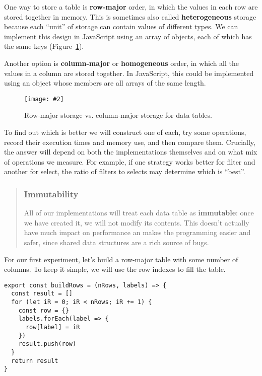 \documentclass[krantzl]{krantz}
\newcommand{\figpdf}[4]{\begin{figure}%
\centering%
\texttt{[image: \#2]}%
\caption{#3}%
\label{#1}%
\end{figure}}
\newcommand{\figref}[1]{Figure~\ref{#1}}
\newcommand{\glossref}[1]{\textbf{#1}}
\newenvironment{callout}{\savenotes\begin{tBox}\begin{quotation}\toggletrue{inbox}\renewcommand{\thempfootnote}{\arabic{footnote}}}{\end{quotation}\vspace{\baselineskip}\end{tBox}\togglefalse{inbox}\spewnotes}
\begin{document}
One way to store a table is \glossref{row-major} order,
in which the values in each row are stored together in memory.
This is sometimes also called \glossref{heterogeneous} storage
because each “unit” of storage can contain values of different types.
We can implement this design in JavaScript using an array of objects,
each of which has the same keys
(\figref{data-table-storage-order}).


Another option is \glossref{column-major}
or \glossref{homogeneous} order,
in which all the values in a column are stored together.
In JavaScript,
this could be implemented using an object
whose members are all arrays of the same length.

\figpdf{data-table-storage-order}{./data-table/storage-order.pdf}{Row-major storage vs. column-major storage for data tables.}{0.6}


To find out which is better
we will construct one of each,
try some operations,
record their execution times and memory use,
and then compare them.
Crucially,
the answer will depend on both the implementations themselves
and on what mix of operations we measure.
For example,
if one strategy works better for filter and another for select,
the ratio of filters to selects may determine which is “best”.

\begin{callout}


\subsubsection*{Immutability}


All of our implementations will treat each data table as \glossref{immutable}:
once we have created it,
we will not modify its contents.
This doesn’t actually have much impact on performance
an makes the programming easier and safer,
since shared data structures are a rich source of bugs.

\end{callout}


For our first experiment,
let’s build a row-major table with some number of columns.
To keep it simple,
we will use the row indexes to fill the table.


\begin{lstlisting}[frame=tblr]
export const buildRows = (nRows, labels) => {
  const result = []
  for (let iR = 0; iR < nRows; iR += 1) {
    const row = {}
    labels.forEach(label => {
      row[label] = iR
    })
    result.push(row)
  }
  return result
}
\end{lstlisting}
\end{document}
